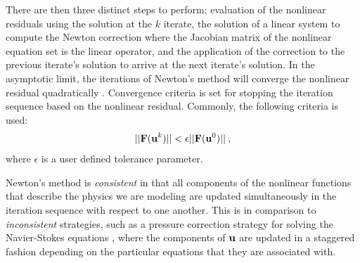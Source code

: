 There are then three distinct steps to perform: evaluation of the
nonlinear residuals using the solution at the $k$ iterate, the
solution of a linear system to compute the Newton correction where the
Jacobian matrix of the nonlinear equation set is the linear operator,
and the application of the correction to the previous iterate's
solution to arrive at the next iterate's solution. In the asymptotic
limit, the iterations of Newton's method will converge the nonlinear
residual quadratically \cite{kelley_iterative_1995}. Convergence
criteria is set for stopping the iteration sequence based on the
nonlinear residual. Commonly, the following criteria is used:
\begin{equation}
  ||\mathbf{F}(\mathbf{u}^{k})|| < \epsilon ||\mathbf{F}(\mathbf{u}^{0})||\:,
  \label{eq:newton_stopping_criteria}
\end{equation}
where $\epsilon$ is a user defined tolerance parameter. 

Newton's method is \textit{consistent} in that all components of the
nonlinear functions that describe the physics we are modeling are
updated simultaneously in the iteration sequence with respect to one
another. This is in comparison to \textit{inconsistent} strategies,
such as a pressure correction strategy for solving the Navier-Stokes
equations \cite{pletcher_computational_1997}, where the components of
$\mathbf{u}$ are updated in a staggered fashion depending on the
particular equations that they are associated with.

